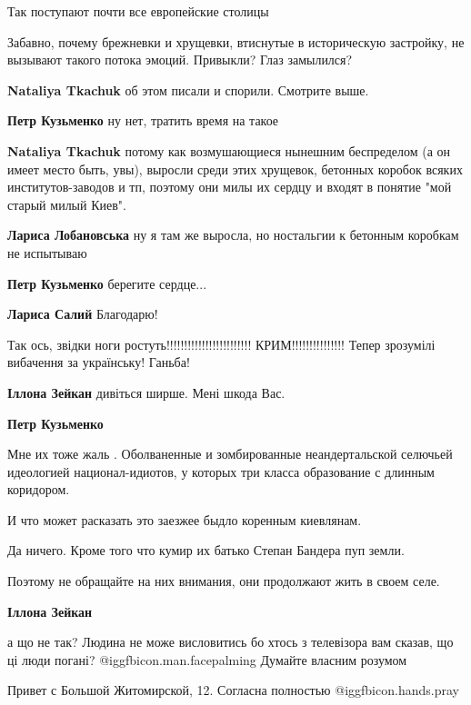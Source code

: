 \begin{itemize}
Так поступают почти все европейские столицы

Забавно, почему брежневки и хрущевки, втиснутые в историческую застройку, не
вызывают такого потока эмоций. Привыкли? Глаз замылился?

\begin{itemize} %
\textbf{Nataliya Tkachuk} об этом писали и спорили. Смотрите выше.

\textbf{Петр Кузьменко} ну нет, тратить время на такое

\textbf{Nataliya Tkachuk} потому как возмушающиеся нынешним беспределом (а он имеет место быть, увы), выросли среди этих хрущевок, бетонных коробок всяких институтов-заводов и тп, поэтому они милы их сердцу и входят в понятие "мой старый милый Киев".

\textbf{Лариса Лобановська} ну я там же выросла, но ностальгии к бетонным коробкам не испытываю

\textbf{Петр Кузьменко} берегите сердце...

\textbf{Лариса Салий} Благодарю!

Так ось, звідки ноги ростуть!!!!!!!!!!!!!!!!!!!!!!!! КРИМ!!!!!!!!!!!!!!! Тепер зрозумілі вибачення за українську! Ганьба!

\textbf{Іллона Зейкан} дивіться ширше. Мені шкода Вас.

\textbf{Петр Кузьменко} 

Мне их тоже жаль . Оболваненные и зомбированные неандертальской селючьей
идеологией национал-идиотов, у которых три класса образование с длинным
коридором.

И что может расказать это заезжее быдло коренным киевлянам.

Да ничего. Кроме того что кумир их батько Степан Бандера пуп земли.

Поэтому не обращайте на них внимания, они продолжают жить в своем селе.

\textbf{Іллона Зейкан} 

а що не так? Людина не може висловитись бо хтось з телевізора вам сказав, що ці
люди погані?  @igg{fbicon.man.facepalming}  Думайте власним розумом

\end{itemize} %

Привет с Большой Житомирской, 12.
Согласна полностью  @igg{fbicon.hands.pray} 


\end{itemize}

